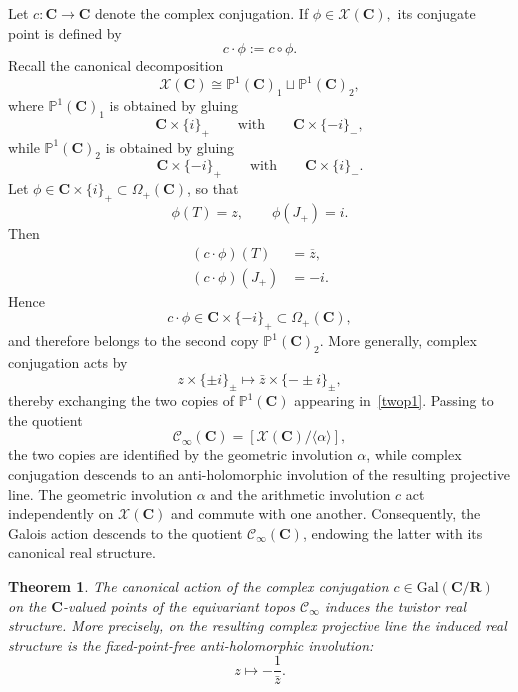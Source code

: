 \documentclass[11pt,a4paper]{article}
\let\mathscr\mathscr
\newtheorem{theorem}{Theorem}[section]
\newcommand{\C}{\mathbf{C}}
\renewcommand{\P}{\mathbb{P}}
\newcommand{\R}{\mathbf{R}}
\newcommand{\minf}{\mathscr C_\infty}
\newcommand{\Gal}{\mathrm{Gal}}
\begin{document}
Let
$
c:\C\longrightarrow\C
$
denote  the complex conjugation. If
$
\phi\in \mathcal X(\C),
$
its conjugate point is defined by
\[
c\cdot\phi:=c\circ\phi.
\]
Recall the canonical decomposition
\begin{equation}\label{twop1}
\mathcal X(\C)\cong
\P^1(\C)_1\sqcup\P^1(\C)_2,
\end{equation}
where $\P^1(\C)_1$ is obtained by gluing
\[
\C\times\{i\}_+
\qquad\text{with}\qquad
\C\times\{-i\}_-,
\]
while $\P^1(\C)_2$ is obtained by gluing
\[
\C\times\{-i\}_+
\qquad\text{with}\qquad
\C\times\{i\}_-.
\]
Let
$
\phi\in\C\times\{i\}_+\subset\Omega_+(\C)$, 
so that
\[
\phi(T)=z,
\qquad
\phi(J_+)=i.
\]
Then
\begin{align}
(c\cdot\phi)(T)&=\overline z,\label{phip}\\
(c\cdot\phi)(J_+)&=-i.\nonumber
\end{align}
Hence
\[
c\cdot\phi\in
\C\times\{-i\}_+\subset\Omega_+(\C),
\]
and therefore belongs to the second copy
$\P^1(\C)_2$.
More generally, complex conjugation acts by
\[
z\times \{\pm i\}_\pm
\longmapsto
\bar z\times \{-\pm i\}_\pm,
\]
thereby exchanging the two copies of
$\P^1(\C)$ appearing in~\eqref{twop1}.
Passing to the quotient
\[
\minf(\C)
=
[\mathcal X(\C)/\langle\alpha\rangle],
\]
the two copies are identified by the geometric involution $\alpha$, while
complex conjugation descends to an anti-holomorphic involution of the
resulting projective line. 
The geometric involution $\alpha$ and the arithmetic involution $c$ act
independently on $\mathcal X(\C)$ and commute with one another. Consequently, the
Galois action descends to the quotient
$\minf(\C)$, endowing the latter with its canonical real
structure.


\begin{theorem}
\label{thm:twistor_space_scheme}
The canonical action of the complex conjugation
$
c\in\Gal(\C/\R)
$
on the $\C$-valued points of the equivariant topos
$\minf$ induces the twistor real structure. More precisely,
on the resulting complex projective line the induced real structure is the
fixed-point-free anti-holomorphic involution:
\[
z\longmapsto-\frac1{\bar z}.
\]
\end{theorem}
\end{document}
